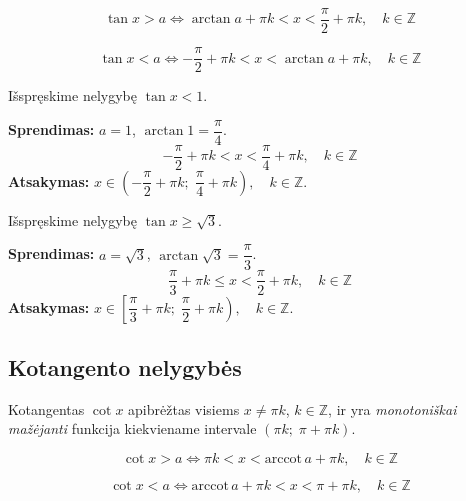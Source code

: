 \begin{tcolorbox}[colback=purple!5!white, colframe=purple!60!black, title=Formulė -- $\tan x > a$]
\[
\tan x > a \iff \arctan a + \pi k < x < \frac{\pi}{2} + \pi k, \quad k \in \mathbb{Z}
\]
\end{tcolorbox}

\begin{tcolorbox}[colback=purple!5!white, colframe=purple!60!black, title=Formulė -- $\tan x < a$]
\[
\tan x < a \iff -\frac{\pi}{2} + \pi k < x < \arctan a + \pi k, \quad k \in \mathbb{Z}
\]
\end{tcolorbox}

\begin{example}
Išspręskime nelygybę $\tan x < 1$.

\textbf{Sprendimas:} $a = 1$, $\arctan 1 = \dfrac{\pi}{4}$.
\[
-\frac{\pi}{2} + \pi k < x < \frac{\pi}{4} + \pi k, \quad k \in \mathbb{Z}
\]
\textbf{Atsakymas:} $x \in \left(-\dfrac{\pi}{2} + \pi k;\; \dfrac{\pi}{4} + \pi k\right), \quad k \in \mathbb{Z}$.
\end{example}

\begin{example}
Išspręskime nelygybę $\tan x \geq \sqrt{3}$.

\textbf{Sprendimas:} $a = \sqrt{3}$, $\arctan \sqrt{3} = \dfrac{\pi}{3}$.
\[
\frac{\pi}{3} + \pi k \leq x < \frac{\pi}{2} + \pi k, \quad k \in \mathbb{Z}
\]
\textbf{Atsakymas:} $x \in \left[\dfrac{\pi}{3} + \pi k;\; \dfrac{\pi}{2} + \pi k\right), \quad k \in \mathbb{Z}$.
\end{example}

\subsection{Kotangento nelygybės}

Kotangentas $\cot x$ apibrėžtas visiems $x \neq \pi k$, $k \in \mathbb{Z}$, ir yra \emph{monotoniškai mažėjanti} funkcija kiekviename intervale $(\pi k;\; \pi + \pi k)$.

\begin{tcolorbox}[colback=teal!5!white, colframe=teal!60!black, title=Formulė -- $\cot x > a$]
\[
\cot x > a \iff \pi k < x < \text{arccot}\, a + \pi k, \quad k \in \mathbb{Z}
\]
\end{tcolorbox}

\begin{tcolorbox}[colback=teal!5!white, colframe=teal!60!black, title=Formulė -- $\cot x < a$]
\[
\cot x < a \iff \text{arccot}\, a + \pi k < x < \pi + \pi k, \quad k \in \mathbb{Z}
\]
\end{tcolorbox}

